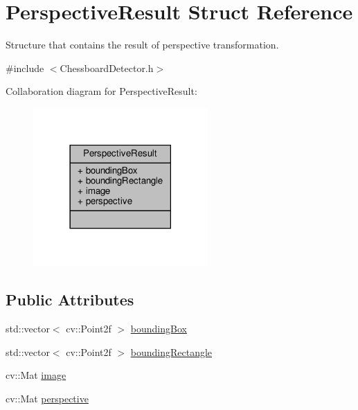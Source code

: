 \hypertarget{struct_perspective_result}{}\section{Perspective\+Result Struct Reference}
\label{struct_perspective_result}


Structure that contains the result of perspective transformation.  




{\ttfamily \#include $<$Chessboard\+Detector.\+h$>$}



Collaboration diagram for Perspective\+Result\+:\nopagebreak
\begin{figure}[H]
\begin{center}
\leavevmode
\includegraphics[width=189pt]{struct_perspective_result__coll__graph}
\end{center}
\end{figure}
\subsection*{Public Attributes}
\begin{DoxyCompactItemize}
\item 
std\+::vector$<$ cv\+::\+Point2f $>$ \hyperlink{struct_perspective_result_a2780569aa3456b68798cad4697af8647}{bounding\+Box}
\item 
std\+::vector$<$ cv\+::\+Point2f $>$ \hyperlink{struct_perspective_result_a78e1db1b132a9e364ab5f2c3b452b611}{bounding\+Rectangle}
\item 
cv\+::\+Mat \hyperlink{struct_perspective_result_a0d73af1103688870135ebb3ff7bcdbdc}{image}
\item 
cv\+::\+Mat \hyperlink{struct_perspective_result_af3e15ad54fa2f84ad2d782a2f0fd6e73}{perspective}
\end{DoxyCompactItemize}


